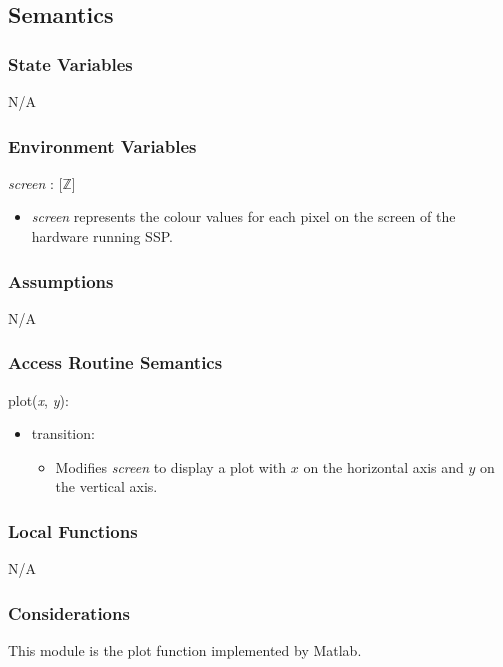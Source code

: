 \documentclass[12pt, titlepage]{article}
\newcommand{\progname}{SSP}
\begin{document}
\subsection{Semantics}

\subsubsection{State Variables}

N/A

\subsubsection{Environment Variables}

\textit{screen} : [$\mathbb{Z}$]
\begin{itemize}
	\item \textit{screen} represents the colour values for each pixel on the 
	screen of the hardware running \progname{}. \\
\end{itemize}

\subsubsection{Assumptions}

N/A

\subsubsection{Access Routine Semantics}

plot(\textit{x}, \textit{y}):
\begin{itemize}
	\item transition: 
	\begin{itemize}
		\item[] Modifies \textit{screen} to display a plot with $x$ on the 
		horizontal axis and $y$ on the vertical axis.
	\end{itemize}
\end{itemize}

\subsubsection{Local Functions}

N/A

\subsubsection{Considerations}
This module is the plot function implemented by Matlab.
\end{document}
